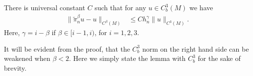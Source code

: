 \documentclass[11pt,reqno]{amsart}
\numberwithin{equation}{section}
\theoremstyle{plain}
\begin{document}
\begin{lem}\label{lem:EnTnEstToUInC3}
  There is universal constant $C$ such that for any $u \in C^{3}_b(M)$ we have
  \begin{align*}
    \|\tilde \pi_n^\beta u-u\|_{C^{\beta}(M)} & \leq Ch_n^\gamma \|u\|_{C^3(M)}.
  \end{align*}		
  Here, $\gamma= i-\beta$ if $\beta \in [i-1,i)$, for $i=1,2,3$.
\end{lem}

\begin{rem}\label{rem:C3 norm assumption can be weakened}
  It will be evident from the proof, that the $C^3_b$ norm on the right hand side can be weakened when $\beta<2$. Here we simply state the lemma with $C^3_b$ for the sake of brevity.
\end{rem}
\end{document}
